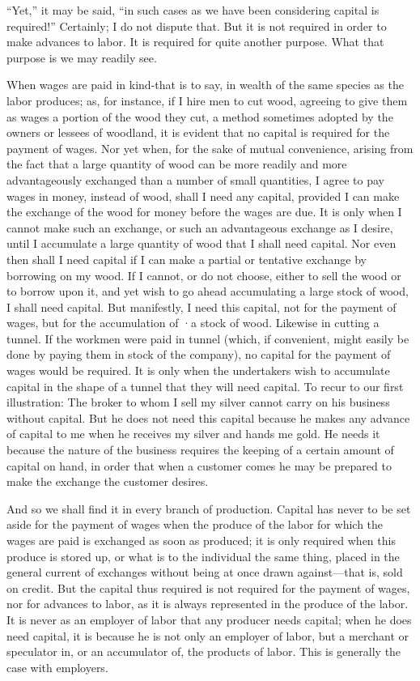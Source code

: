 ``Yet,'' it may be said, ``in such cases as we have been considering
capital is required!'' Certainly; I do not dispute that. But it is not
required in order to make advances to labor. It is required for quite
another purpose. What that purpose is we may readily see.

When wages are paid in kind-that is to say, in wealth of the same
species as the labor produces; as, for instance, if I hire men to cut
wood, agreeing to give them as wages a portion of the wood they cut, a
method sometimes adopted by the owners or lessees of woodland, it is
evident that no capital is required for the payment of wages. Nor yet
when, for the sake of mutual convenience, arising from the fact that a
large quantity of wood can be more readily and more advantageously
exchanged than a number of small quantities, I agree to pay wages in
money, instead of wood, shall I need any capital, provided I can make
the exchange of the wood for money before the wages are due. It is only
when I cannot make such an exchange, or such an advantageous exchange as
I desire, until I accumulate a large quantity of wood that I shall need
capital. Nor even then shall I need capital if I can make a partial or
tentative exchange by borrowing on my wood. If I cannot, or do not
choose, either to sell the wood or to borrow upon it, and yet wish to go
ahead accumulating a large stock of wood, I shall need capital. But
manifestly, I need this capital, not for the payment of wages, but for
the accumulation of ·a stock of wood. Likewise in cutting a tunnel. If
the workmen were paid in tunnel (which, if convenient, might easily be
done by paying them in stock of the company), no capital for the payment
of wages would be required. It is only when the undertakers wish to
accumulate capital in the shape of a tunnel that they will need capital.
To recur to our first illustration: The broker to whom I sell my silver
cannot carry on his business without capital. But he does not need this
capital because he makes any advance of capital to me when he receives
my silver and hands me gold. He needs it because the nature of the
business requires the keeping of a certain amount of capital on hand, in
order that when a customer comes he may be prepared to make the exchange
the customer desires.

And so we shall find it in every branch of production. Capital has never
to be set aside for the payment of wages when the produce of the labor
for which the wages are paid is exchanged as soon as produced; it is
only required when this produce is stored up, or what is to the
individual the same thing, placed in the general current of exchanges
without being at once drawn against---that is, sold on credit. But the
capital thus required is not required for the payment of wages, nor for
advances to labor, as it is always represented in the produce of the
labor. It is never as an employer of labor that any producer needs
capital; when he does need capital, it is because he is not only an
employer of labor, but a merchant or speculator in, or an accumulator
of, the products of labor. This is generally the case with employers.

